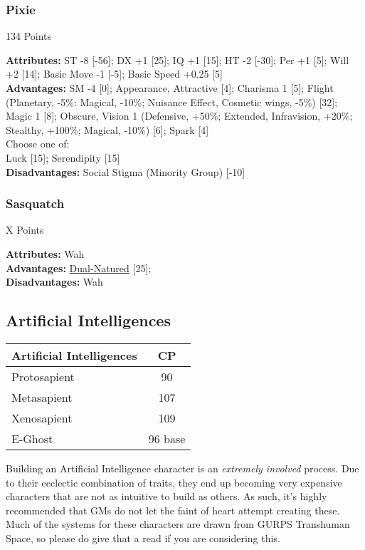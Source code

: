 \begin{multicols*}{3}
	\subsubsection*{Pixie}
	\begin{flushright}
		134 Points
	\end{flushright}
	\textbf{Attributes:} 
	ST -8 [-56]; DX +1 [25]; IQ +1 [15]; HT -2 [-30]; Per +1 [5]; Will +2 [14]; Basic Move -1 [-5]; Basic Speed +0.25 [5]
	\\\textbf{Advantages:} 
	SM -4 [0]; Appearance, Attractive [4]; Charisma 1 [5]; Flight (Planetary, -5\%: Magical, -10\%; Nuisance Effect,  Cosmetic wings, -5\%) [32]; Magic 1 [8]; Obscure, Vision 1 (Defensive, +50\%; Extended, Infravision, +20\%; Stealthy, +100\%; Magical, -10\%) [6]; Spark [4]
	\\ Choose one of: \\
	Luck [15]; Serendipity [15]
	\\\textbf{Disadvantages:}
	Social Stigma (Minority Group) [-10]
	
	\subsubsection*{Sasquatch}
	\begin{flushright}
		X Points
	\end{flushright}
	\textbf{Attributes:} 
	Wah
	\\\textbf{Advantages:} 
	\hyperref[dual_natured]{Dual-Natured} [25]; 
	\\\textbf{Disadvantages:} 
	Wah
	
	\subsection{Artificial Intelligences}
	
	\begin{center}
		\begin{tabularx}{0.32\textwidth}{|X|c|}
			\hline
			Artificial Intelligences & CP \\
			\hline
			\hline
			Protosapient & 90\\
			Metasapient & 107\\
			Xenosapient & 109 \\
			E-Ghost & 96 base\\
			\hline
		\end{tabularx}
	\end{center}
	
	Building an Artificial Intelligence character is an \textit{extremely involved} process. Due to their ecclectic combination of traits, they end up becoming very expensive characters that are not as intuitive to build as others. As such, it's highly recommended that GMs do not let the faint of heart attempt creating these. Much of the systems for these characters are drawn from GURPS Transhuman Space, so please do give that a read if you are considering this.
	

\end{multicols*}
